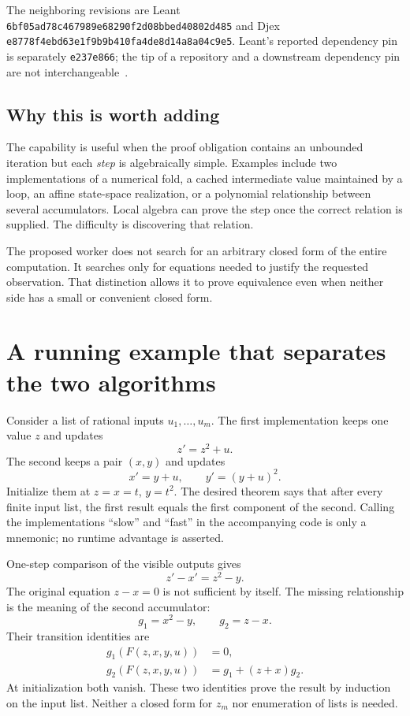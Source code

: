 \documentclass[11pt,letterpaper]{article}
\theoremstyle{definition}
\newcommand{\code}[1]{\nolinkurl{#1}}
\begin{document}
The neighboring revisions are Leant
\code{6bf05ad78c467989e68290f2d08bbed40802d485} and Djex
\code{e8778f4ebd63e1f9b9b410fa4de8d14a8a04c9e5}. Leant's reported dependency pin
is separately \code{e237e866}; the tip of a repository and a downstream dependency
pin are not interchangeable~\cite{leant-readme,djex-readme}.

\subsection{Why this is worth adding}
The capability is useful when the proof obligation contains an unbounded
iteration but each \emph{step} is algebraically simple. Examples include two
implementations of a numerical fold, a cached intermediate value maintained by
a loop, an affine state-space realization, or a polynomial relationship between
several accumulators. Local algebra can prove the step once the correct
relation is supplied. The difficulty is discovering that relation.

The proposed worker does not search for an arbitrary closed form of the entire
computation. It searches only for equations needed to justify the requested
observation. That distinction allows it to prove equivalence even when neither
side has a small or convenient closed form.

\section{A running example that separates the two algorithms}
\label{sec:example}

Consider a list of rational inputs $u_1,\ldots,u_m$. The first implementation
keeps one value $z$ and updates
\begin{equation}\label{eq:slow}
 z' = z^2+u.
\end{equation}
The second keeps a pair $(x,y)$ and updates
\begin{equation}\label{eq:fast}
 x'=y+u,\qquad y'=(y+u)^2.
\end{equation}
Initialize them at $z=x=t$, $y=t^2$. The desired theorem says that after every
finite input list, the first result equals the first component of the second.
Calling the implementations ``slow'' and ``fast'' in the accompanying code is
only a mnemonic; no runtime advantage is asserted.

One-step comparison of the visible outputs gives
\[
 z'-x'=z^2-y.
\]
The original equation $z-x=0$ is not sufficient by itself. The missing
relationship is the meaning of the second accumulator:
\[
 g_1=x^2-y,\qquad g_2=z-x.
\]
Their transition identities are
\begin{align}
 g_1(F(z,x,y,u))&=0,\label{eq:ex-step1}\\
 g_2(F(z,x,y,u))&=g_1+(z+x)g_2.\label{eq:ex-step2}
\end{align}
At initialization both vanish. These two identities prove the result by
induction on the input list. Neither a closed form for $z_m$ nor enumeration of
lists is needed.
\end{document}
